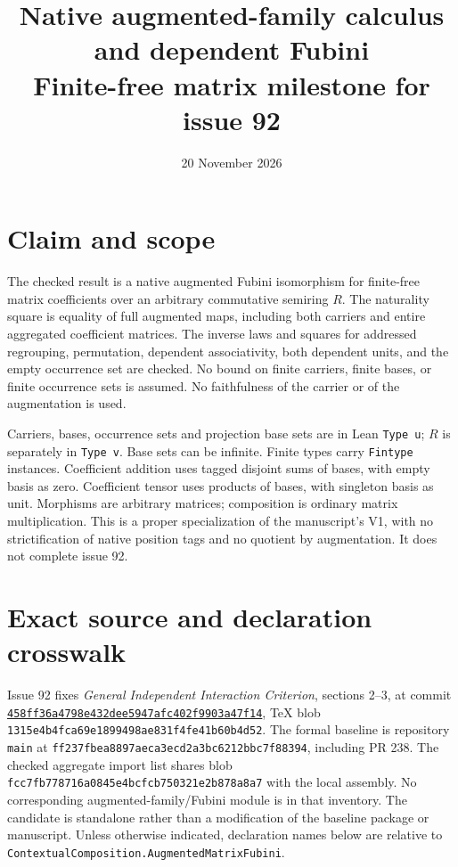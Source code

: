 \documentclass[11pt]{article}
\title{Native augmented-family calculus and dependent Fubini\\
       Finite-free matrix milestone for issue 92}
\date{20 November 2026}
\begin{document}
\maketitle

\section*{Claim and scope}
The checked result is a native augmented Fubini isomorphism for finite-free
matrix coefficients over an arbitrary commutative semiring $R$. The naturality
square is equality of full augmented maps, including both carriers and
entire aggregated coefficient matrices. The inverse laws and squares
for addressed regrouping, permutation, dependent associativity, both
dependent units, and the empty occurrence set are checked. No bound on
finite carriers, finite bases, or finite occurrence sets is assumed.
No faithfulness of the carrier or of the augmentation is used.

Carriers, bases, occurrence sets and projection base sets are in Lean
\texttt{Type u}; $R$ is separately in \texttt{Type v}. Base sets can be
infinite. Finite types carry \texttt{Fintype} instances. Coefficient addition
uses tagged disjoint sums of bases, with empty basis as zero. Coefficient
tensor uses products of bases, with singleton basis as unit. Morphisms are
arbitrary matrices; composition is ordinary matrix multiplication.
This is a proper specialization of the manuscript's V1, with no
strictification of native position tags and no quotient by augmentation.
It does not complete issue 92.

\section*{Exact source and declaration crosswalk}
Issue 92 fixes \emph{General Independent Interaction Criterion}, sections 2--3,
at commit
\href{https://github.com/eternal-november/eos-research-programmes/blob/458ff36a4798e432dee5947afc402f9903a47f14/projects/contextual-composition/interaction/independent-criterion/General_Independent_Interaction_Criterion.tex}
{\texttt{458ff36a4798e432dee5947afc402f9903a47f14}},
TeX blob \texttt{1315e4b4fca69e1899498ae831f4fe41b60b4d52}.
The formal baseline is repository \texttt{main} at
\texttt{ff237fbea8897aeca3ecd2a3bc6212bbc7f88394}, including PR 238.
The checked aggregate import list shares blob
\texttt{fcc7fb778716a0845e4bcfcb750321e2b878a8a7} with the local assembly.
No corresponding augmented-family/Fubini module is in that inventory.
The candidate is standalone rather than a modification of the baseline
package or manuscript. Unless otherwise indicated, declaration names below
are relative to \texttt{ContextualComposition.AugmentedMatrixFubini}.
\end{document}
